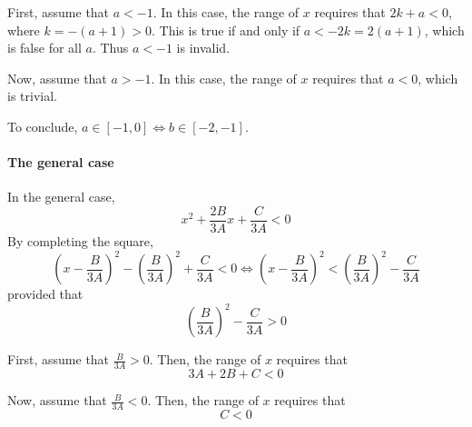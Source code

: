 \documentclass[a4paper, 11pt]{scrartcl}
\begin{document}
First, assume that $a < -1$. In this case, the range of $x$ requires that $2k + a < 0$, where $k = -(a + 1) > 0$. This is true if and only if $a < -2k = 2(a + 1)$, which is false for all $a$. Thus $a < -1$ is invalid.

Now, assume that $a > -1$. In this case, the range of $x$ requires that $a < 0$, which is trivial.

To conclude, $a\in[-1, 0] \iff b\in[-2, -1]$.


\paragraph{The general case}
In the general case,
\[
x^2 +\frac{2B}{3A}x + \frac{C}{3A} < 0
\]
By completing the square,
\[
 \left(x - \frac{B}{3A}\right)^2 - \left(\frac{B}{3A}\right)^2 + \frac{C}{3A} < 0 \iff \left(x - \frac{B}{3A}\right)^2  < \left(\frac{B}{3A}\right)^2 - \frac{C}{3A}
\]
provided that
\[
\left(\frac{B}{3A}\right)^2 - \frac{C}{3A} > 0
\]

First, assume that $\frac{B}{3A} > 0$. Then, the range of $x$ requires that
\[
3A + 2B + C < 0
\]

Now, assume that $\frac{B}{3A} < 0$. Then, the range of $x$ requires that
\[
 C < 0
\]
\end{document}
